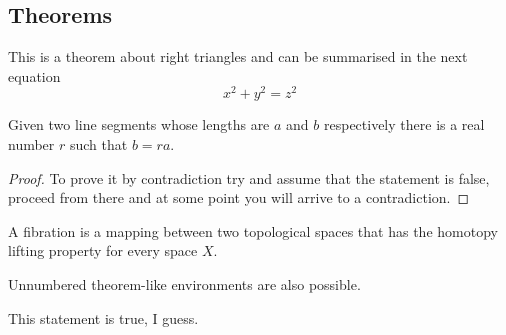 \subsection{Theorems}

\begin{theorem}
  \label{pythagorean}
  This is a theorem about right triangles and can be summarised in the next
  equation
  \[ x^2 + y^2 = z^2 \]
\end{theorem}

\begin{lemma}
  Given two line segments whose lengths are \(a\) and \(b\) respectively there is a
  real number \(r\) such that \(b=ra\).
\end{lemma}

\begin{proof}
  To prove it by contradiction try and assume that the statement is false,
  proceed from there and at some point you will arrive to a contradiction.
\end{proof}

\begin{definition}[Fibration]
  A fibration is a mapping between two topological spaces that has the homotopy lifting property for every space \(X\).
\end{definition}

Unnumbered theorem-like environments are also possible.

\begin{remark}
  This statement is true, I guess.
\end{remark}
